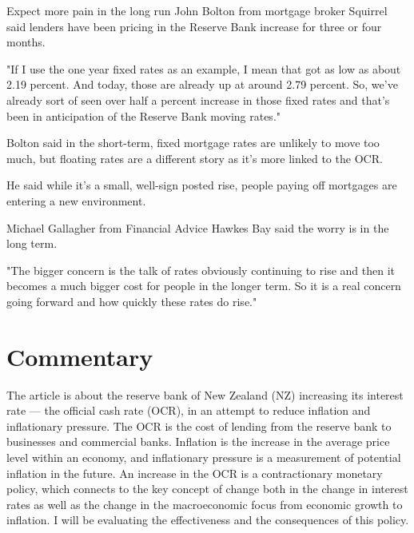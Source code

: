 \documentclass[a4paper,12pt]{article}
\begin{document}
{Expect more pain in the long run
John Bolton from mortgage broker Squirrel said lenders have been pricing in the Reserve Bank increase for three or four months.

"If I use the one year fixed rates as an example, I mean that got as low as about 2.19 percent. And today, those are already up at around 2.79 percent. So, we've already sort of seen over half a percent increase in those fixed rates and that's been in anticipation of the Reserve Bank moving rates."

Bolton said in the short-term, fixed mortgage rates are unlikely to move too much, but floating rates are a different story as it's more linked to the OCR.

He said while it's a small, well-sign posted rise, people paying off mortgages are entering a new environment.

Michael Gallagher from Financial Advice Hawkes Bay said the worry is in the long term.

"The bigger concern is the talk of rates obviously continuing to rise and then it becomes a much bigger cost for people in the longer term. So it is a real concern going forward and how quickly these rates do rise."

\newpage
}

\section*{Commentary}

The article is about the reserve bank of New Zealand (NZ) increasing its interest rate --- the official cash rate (OCR), in an attempt to reduce inflation and inflationary pressure. The OCR is the cost of lending from the reserve bank to businesses and commercial banks. Inflation is the increase in the average price level within an economy, and inflationary pressure is a measurement of potential inflation in the future. An increase in the OCR is a contractionary monetary policy, which connects to the key concept of change both in the change in interest rates as well as the change in the macroeconomic focus from economic growth to inflation. I will be evaluating the effectiveness and the consequences of this policy.
\end{document}
